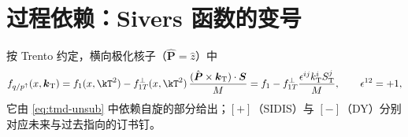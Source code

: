 \section{过程依赖：Sivers 函数的变号}
\label{sec:sivers}

按 Trento 约定\cite{BacchettaEtAl2004}，横向极化核子（$\hat{\boldsymbol P}=\hat z$）中
\begin{equation}
  f_{q/p^\uparrow}(x,\boldsymbol k_{\mathrm T})=f_1(x,\kT^2)-f_{1T}^\perp(x,\kT^2)\,\frac{(\hat{\boldsymbol P}\times\boldsymbol k_{\mathrm T})\cdot\boldsymbol S}{M}
  =f_1-f_{1T}^\perp\frac{\epsilon^{ij}k_{\mathrm T}^iS_{\mathrm T}^j}{M},\qquad\epsilon^{12}=+1,
  \label{eq:sivers-def}
\end{equation}
它由 \eqref{eq:tmd-unsub} 中依赖自旋的部分给出；$[+]$（SIDIS）与 $[-]$（DY）分别对应未来与过去指向的订书钉。

